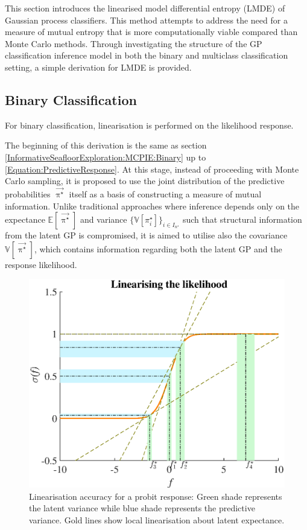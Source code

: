 		This section introduces the linearised model differential entropy (LMDE) of Gaussian process classifiers. This method attempts to address the need for a measure of mutual entropy that is more computationally viable compared than Monte Carlo methods. Through investigating the structure of the GP classification inference model in both the binary and multiclass classification setting, a simple derivation for LMDE is provided.
		
		\subsection{Binary Classification}
		\label{InformativeSeafloorExploration:LMDE:Binary}
		
			For binary classification, linearisation is performed on the likelihood response.
					
			The beginning of this derivation is the same as section \ref{InformativeSeafloorExploration:MCPIE:Binary} up to \eqref{Equation:PredictiveResponse}. At this stage, instead of proceeding with Monte Carlo sampling, it is proposed to use the joint distribution of the predictive probabilities $\vec{\uppi^{\star}}$ itself as a basis of constructing a measure of mutual information. Unlike traditional approaches where inference depends only on the expectance $\mathbb{E}[\vec{\uppi^{\star}}]$ and variance $\{\mathbb{V}[\pi^{\star}_{i}]\}_{i \in I_{n^{\star}}}$ such that structural information from the latent GP is compromised, it is aimed to utilise also the covariance $\mathbb{V}[\vec{\uppi^{\star}}]$, which contains information regarding both the latent GP and the response likelihood.
		
			\begin{figure}[!htbp]
				\centering
					\includegraphics[width = 0.6\linewidth]{Figures/linearisation.eps}
				\caption{Linearisation accuracy for a probit response: Green shade represents the latent variance while blue shade represents the predictive variance. Gold lines show local linearisation about latent expectance.}
				\label{Figure:Linearisation}
			\end{figure}
				
